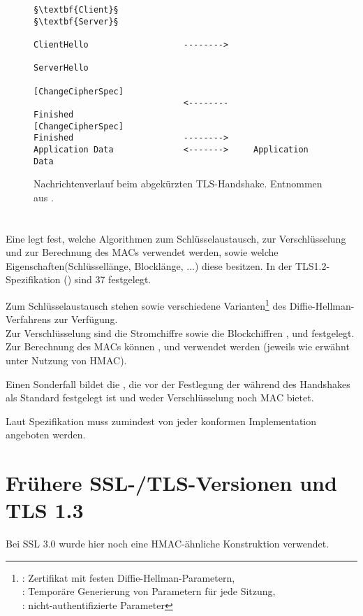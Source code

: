 \lstset{
	style=default,
	frame=single
}
\begin{figure}[H]
	\centering
	\begin{lstlisting}
§\textbf{Client}§                                                §\textbf{Server}§

ClientHello                   -------->
                                                 ServerHello
                                          [ChangeCipherSpec]
                              <--------             Finished
[ChangeCipherSpec]
Finished                      -------->
Application Data              <------->     Application Data
	\end{lstlisting}
	\caption{Nachrichtenverlauf beim abgekürzten TLS-Handshake. Entnommen aus \cite{tls12}.}
	\label{fig_abbreviated_handshake}
\end{figure}
\lstset{style=tls}


\section{\ciphersuites{}}

Eine \ciphersuite{} legt fest, welche Algorithmen zum Schlüsselaustausch, zur Verschlüsselung und zur Berechnung des MACs verwendet werden, sowie welche Eigenschaften(Schlüssellänge, Blocklänge, ...) diese besitzen. In der TLS1.2-Spezifikation (\cite{tls12}) sind 37 \ciphersuites{} festgelegt.

Zum Schlüsselaustausch stehen  sowie verschiedene Varianten\footnote{
	: Zertifikat mit festen Diffie-Hellman-Parametern,\\ 
	: Temporäre Generierung von Parametern für jede Sitzung, \\
	:  nicht-authentifizierte Parameter
} des Diffie-Hellman-Verfahrens zur Verfügung. \\
Zur Verschlüsselung sind die Stromchiffre  sowie die Blockchiffren ,  und  festgelegt. \\
Zur Berechnung des MACs können ,  und  verwendet werden (jeweils wie erwähnt unter Nutzung von HMAC).

Einen Sonderfall bildet die \ciphersuite{} , die vor der Festlegung der \ciphersuite{} während des Handshakes als Standard festgelegt ist und weder Verschlüsselung noch MAC bietet.

Laut Spezifikation muss zumindest  von jeder konformen Implementation angeboten werden.

\section{Frühere SSL-/TLS-Versionen und TLS 1.3}

Bei SSL 3.0 wurde hier noch eine HMAC-ähnliche Konstruktion verwendet.